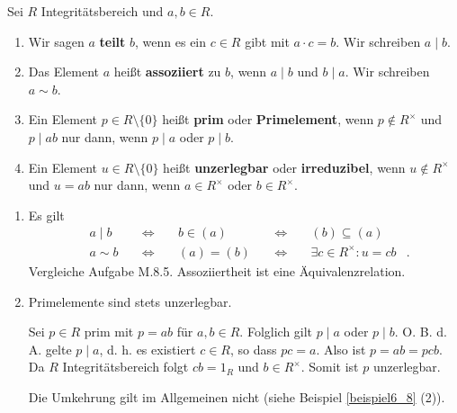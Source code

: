 \begin{definition}
	Sei $R$ Integritätsbereich und $a,b \in R$.
	\begin{enumerate}[label=(\alph*)]
		\item Wir sagen $a$ \textbf{teilt} $b$, wenn es ein $c \in R$ gibt mit $a \cdot c = b$. Wir schreiben $a \mid b$.
		\item Das Element $a$ heißt \textbf{assoziiert} zu $b$, wenn $a \mid b$ und $b \mid a$. Wir schreiben $a \sim b$.
		\item Ein Element $p \in R \setminus \{0\}$ heißt \textbf{prim} oder \textbf{Primelement}, wenn $p \notin R^\times$ und $p \mid ab$ nur dann, wenn $p \mid a$ oder $p \mid b$.
		\item Ein Element $u \in R\setminus \{0\}$ heißt \textbf{unzerlegbar} oder \textbf{irreduzibel}, wenn $u \notin R^\times$ und $u = ab$ nur dann, wenn $a \in R^\times$ oder $b \in R^\times$.
	\end{enumerate}
\end{definition}
\begin{rem}\label{rem6_7}
	\begin{enumerate}[label=(\roman*)]
		\item Es gilt
		\begin{align*}
			&a \mid b& \;&\Leftrightarrow&\; &b \in (a)& \;&\Leftrightarrow&\; &(b) \subseteq (a)&\\
			&a \sim b& \;&\Leftrightarrow&\; &(a) = (b)& \;&\Leftrightarrow&\; &\exists c \in R^\times: u = cb&.
		\end{align*}  
		Vergleiche Aufgabe M.8.5. Assoziiertheit ist eine Äquivalenzrelation.
		\item Primelemente sind stets unzerlegbar.
		\begin{inlproof}
			Sei $p \in R$ prim mit $p = ab$ für $a,b \in R$. Folglich gilt $p \mid a$ oder $p \mid b$. O. B. d. A. gelte $p \mid a$, d. h. es existiert $c \in R$, so dass $pc = a$. Also ist $p = ab = pcb$. Da $R$ Integritätsbereich folgt $cb = 1_R$ und $b \in R^\times$. Somit ist $p$ unzerlegbar.
		\end{inlproof}
		Die Umkehrung gilt im Allgemeinen nicht (siehe Beispiel \ref{beispiel6_8} (2)).
	\end{enumerate}
\end{rem}
